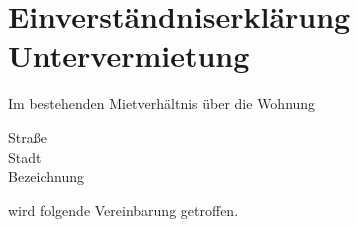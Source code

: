 
\section*{Einverständniserklärung Untervermietung}


Im bestehenden Mietverhältnis über die Wohnung

\vspace{1ex}
\begin{addmargin}[.25\textwidth]{.25\textwidth}
  Straße \MYdotfill \textbf{\WOHNUNGstreet~\WOHNUNGstreetnumber} \\
  Stadt \MYdotfill \textbf{\WOHNUNGzipcode~\WOHNUNGcity} \\
  Bezeichnung \MYdotfill \textbf{\WOHNUNGinfoA~\WOHNUNGinfoB}
\end{addmargin}
\vspace{1ex}

wird folgende Vereinbarung getroffen.

